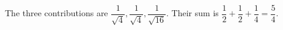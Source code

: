 The three contributions are $\dfrac{1}{\sqrt4},\dfrac{1}{\sqrt4},\dfrac{1}{\sqrt{16}}$. Their sum is $\dfrac{1}{2}+\dfrac{1}{2}+\dfrac{1}{4}=\boxed{\dfrac{5}{4}}$.
